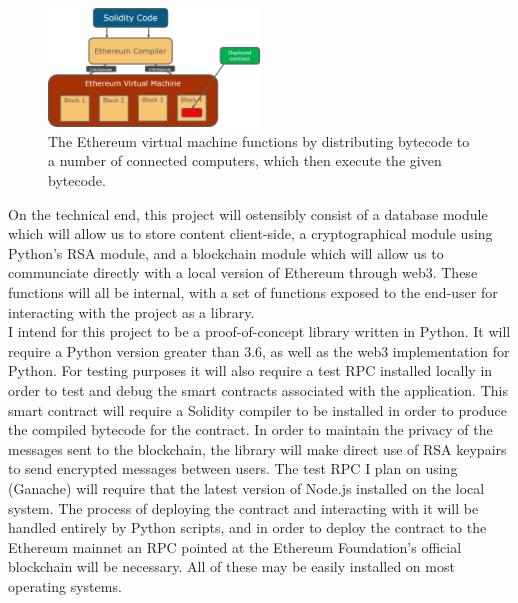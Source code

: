 \documentclass[titlepage]{report}
\begin{document}
\begin{figure}[h]
    \centering
    \includegraphics[width=0.5\textwidth]{ethereum}
    \caption{The Ethereum virtual machine functions by distributing bytecode to a number of connected computers, which then execute the given bytecode.}
\end{figure}

On the technical end, this project will ostensibly consist of a database module which will allow us to store content client-side, a cryptographical module using Python's RSA module, and a blockchain module which will allow us to communciate directly with a local version of Ethereum through web3. These functions will all be internal, with a set of functions exposed to the end-user for interacting with the project as a library.\\

I intend for this project to be a proof-of-concept library written in Python. It will require a Python version greater than 3.6, as well as the \gls{web3} implementation for Python.\cite{web3-py} For testing purposes it will also require a \gls{test RPC} installed locally in order to test and debug the \gls{smart contract}s associated with the application. This smart contract will require a Solidity compiler to be installed in order to produce the compiled bytecode for the contract. In order to maintain the privacy of the messages sent to the blockchain, the library will make direct use of RSA keypairs to send encrypted messages between users. The test RPC I plan on using (Ganache) will require that the latest version of Node.js installed on the local system. The process of deploying the contract and interacting with it will be handled entirely by Python scripts, and in order to deploy the contract to the Ethereum \gls{mainnet} an RPC pointed at the Ethereum Foundation's official blockchain will be necessary. All of these may be easily installed on most operating systems.\\
\end{document}
